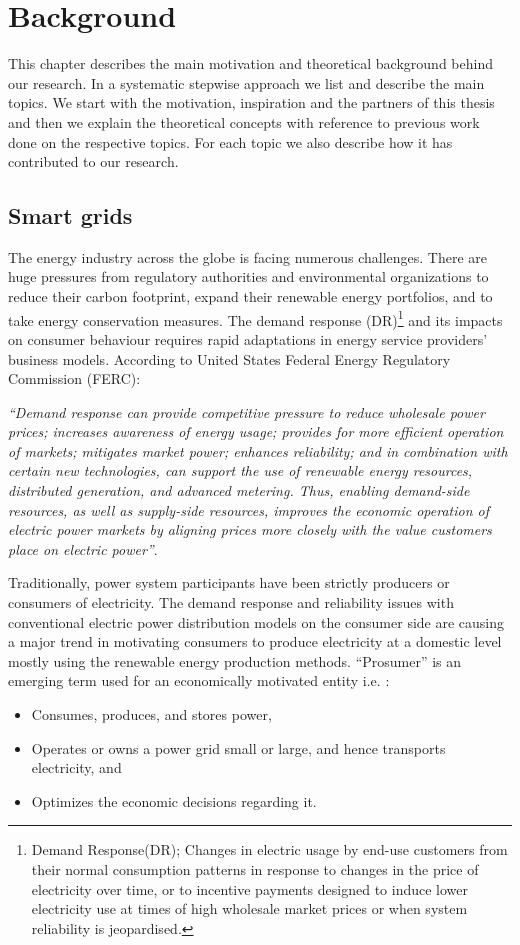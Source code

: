 \chapter{Background}
\label{chapter:background} 

This chapter describes the main motivation and theoretical background behind our research. In a systematic stepwise approach we list and describe the main topics. We start with the motivation, inspiration and the partners of this thesis and then we explain the theoretical concepts with reference to previous work done on the respective topics. For each topic we also describe how it has contributed to our research. 

\section{Smart grids } \label{smartgrid}

The energy industry across the globe is facing numerous challenges. There are huge pressures from regulatory authorities and environmental organizations to reduce their carbon footprint, expand their renewable energy portfolios, and to take energy conservation measures. The demand response (DR)\footnote{Demand Response(DR); Changes in electric usage by end-use customers from their normal consumption patterns in response to changes in the price of electricity over time, or to incentive payments designed to induce lower electricity use at times of high wholesale market prices or when system reliability is jeopardised.} and its impacts on consumer behaviour requires rapid adaptations in energy service providers' business models. According to United States Federal Energy Regulatory Commission (FERC):
 
\emph{``Demand response can provide competitive pressure to reduce wholesale power prices; increases awareness of energy usage; provides for more efficient operation of markets; mitigates market power; enhances reliability; and in combination with certain new technologies, can support the use of renewable energy resources, distributed generation, and advanced metering. Thus, enabling demand-side resources, as well as supply-side resources, improves the economic operation of electric power markets by aligning prices more closely with the value customers place on electric power''}\cite{federal2008assessment}.
  
Traditionally, power system participants have been strictly producers or consumers of electricity. The demand response and reliability issues with conventional electric power distribution models on the consumer side are causing a major trend in motivating consumers to produce electricity at a domestic level mostly using the renewable energy production methods. ``Prosumer'' is an emerging term used for an economically motivated entity i.e. \cite{grijalva2011prosumer}:
\begin{itemize}
\item Consumes, produces, and stores power,
\item Operates or owns a power grid small or large, and hence transports electricity, and
\item Optimizes the economic decisions regarding it.
\end{itemize}


